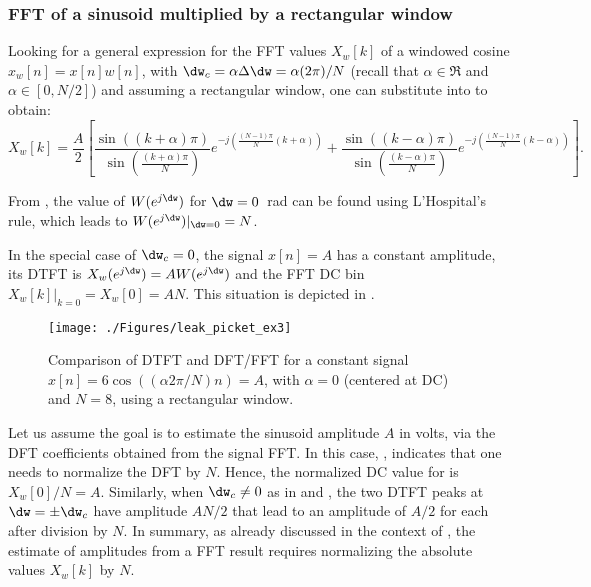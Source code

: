 \subsubsection{{\akadvanced} FFT of a sinusoid multiplied by a rectangular window}

Looking for a general expression for 
the FFT values $X_w[k]$ of a windowed cosine $x_w[n]= x[n] w[n]$, %
with $\dw_c = \alpha \Delta \dw = \alpha (2 \pi)/N$ (recall that $\alpha \in \Re$ and $\alpha \in [0, N/2]$) and assuming
a rectangular window, one can substitute  into  to obtain:
\begin{equation}
X_w[k] = \frac{A}{2} \left[ \frac{\sin \left( (k+\alpha)\pi \right) }{\sin \left( \frac{(k+\alpha)\pi}{N}\right) } e^{-j\left(\frac{(N-1)\pi}{N}(k+\alpha)\right)} +
\frac{\sin \left( (k-\alpha)\pi \right) }{\sin \left( \frac{(k-\alpha)\pi}{N}\right) } e^{-j\left(\frac{(N-1)\pi}{N}(k-\alpha)\right)}
\right].
\label{eq:fftValuesExample}
\end{equation}

From , the value of $W(e^{j \dw})$ for $\dw = 0$~rad can be found using L'Hospital's rule, which leads to $W(e^{j \dw})|_{\dw=0} = N$.

In the special case of $\dw_c=0$, the signal $x[n] = A$ has a constant amplitude, its DTFT is $X_w(e^{j \dw}) = A W(e^{j \dw})$ and the FFT DC bin $X_w[k]|_{k=0} = X_w[0]= A N$. This situation is depicted in .

\begin{figure}[htbp]
\centering
\texttt{[image: ./Figures/leak\_picket\_ex3]}
\caption{Comparison of DTFT and DFT/FFT for a constant signal $x[n]=6\cos((\alpha 2 \pi /N) n) = A$, with $\alpha=0$ (centered at DC) and $N=8$, using a rectangular window.\label{fig:leak_picket_ex3}}
\end{figure}

Let us assume the goal is to estimate the sinusoid amplitude $A$ in volts, via the DFT coefficients obtained from the signal FFT. 
In this case, , indicates that one needs to normalize the DFT by $N$. Hence, the normalized DC value for  is $X_w[0]/N = A$. Similarly, when $\dw_c \ne 0$ as in  and , the two DTFT peaks at $\dw = \pm \dw_c$ have amplitude $A N / 2$ that lead to an amplitude of $A/2$ for each after division by $N$. 
In summary, as already discussed in the context of , the estimate of amplitudes from a FFT result requires normalizing the absolute values $X_w[k]$ by $N$.

